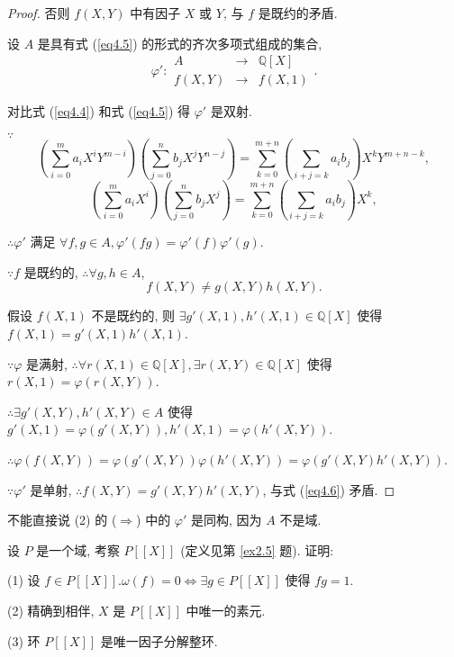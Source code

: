 \documentclass[UTF8]{ctexart}
\begin{document}
\begin{proof}
    否则 $f(X,Y)$ 中有因子 $X$ 或 $Y$, 与 $f$ 是既约的矛盾.

    设 $A$ 是具有式 (\ref{eq4.5}) 的形式的齐次多项式组成的集合,
    \[\varphi':\begin{array}{rcl}
        A & \to & \mathbb{Q}[X] \\
        f(X,Y) & \to & f(X,1)
    \end{array}.\]

    对比式 (\ref{eq4.4}) 和式 (\ref{eq4.5}) 得 $\varphi'$ 是双射.

    $\because$
    \[\left(\sum\limits_{i=0}^ma_iX^iY^{m-i}\right)\left(\sum\limits_{j=0}^nb_jX^jY^{n-j}\right)=\sum\limits_{k=0}^{m+n}\left(\sum\limits_{i+j=k}a_ib_j\right)X^kY^{m+n-k},\]
    \[\left(\sum\limits_{i=0}^ma_iX^i\right)\left(\sum\limits_{j=0}^nb_jX^j\right)=\sum\limits_{k=0}^{m+n}\left(\sum\limits_{i+j=k}a_ib_j\right)X^k,\]

    $\therefore\varphi'$ 满足 $\forall f,g\in A,\varphi'(fg)=\varphi'(f)\varphi'(g)$.

    $\because f$ 是既约的, $\therefore\forall g,h\in A$,
    \begin{equation}\label{eq4.6}
        f(X,Y)\neq g(X,Y)h(X,Y).
    \end{equation}
    
    假设 $f(X,1)$ 不是既约的, 则 $\exists g'(X,1),h'(X,1)\in\mathbb{Q}[X]$ 使得 $f(X,1)=g'(X,1)h'(X,1)$.

    $\because\varphi$ 是满射, $\therefore\forall r(X,1)\in\mathbb{Q}[X],\exists r(X,Y)\in\mathbb{Q}[X]$ 使得 $r(X,1)=\varphi(r(X,Y))$.

    $\therefore\exists g'(X,Y),h'(X,Y)\in A$ 使得 $g'(X,1)=\varphi(g'(X,Y)),h'(X,1)=\varphi(h'(X,Y))$.

    $\therefore\varphi(f(X,Y))=\varphi(g'(X,Y))\varphi(h'(X,Y))=\varphi(g'(X,Y)h'(X,Y))$.

    $\because\varphi'$ 是单射, $\therefore f(X,Y)=g'(X,Y)h'(X,Y)$, 与式 (\ref{eq4.6}) 矛盾.
\end{proof}
\begin{note}
    不能直接说 (2) 的 ($\Rightarrow$) 中的 $\varphi'$ 是同构, 因为 $A$ 不是域.
\end{note}
\begin{exercise}\label{ex3.6}
    设 $P$ 是一个域, 考察 $P[[X]]$ (定义见第 \ref{ex2.5} 题). 证明:

    (1) 设 $f\in P[[X]].\omega(f)=0\Leftrightarrow\exists g\in P[[X]]$ 使得 $fg=1$.

    (2) 精确到相伴, $X$ 是 $P[[X]]$ 中唯一的素元.

    (3) 环 $P[[X]]$ 是唯一因子分解整环.
\end{exercise}
\end{document}

